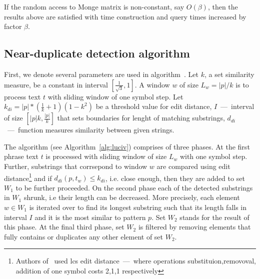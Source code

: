 If the random access to Monge matrix is non-constant, say $O(\beta)$, then the results above are satisfied with time construction and query times increased by factor $\beta$.
  

\subsection{Near-duplicate detection algorithm}
\label{sec:lucivalgo}
First, we denote several parameters are used in algorithm~\cite{luciv2019interactive}.
Let $k$, a set similarity measure, be a constant in interval $[\frac{1}{\sqrt{3}},1]$.
A window $w$ of size $L_{w} = |p|/k$ is to process text $t$ with sliding window of one symbol step.
Let $k_{di} = |p|*(\frac{1}{k}+1)(1-k^2)$ be a threshold value for edit distance,
$I$~---~interval of size $[|p|k,\frac{|p|}{k}]$ that sets boundaries for lenght of matching substrings,
$d_{di}$~---~function measures similarity between given strings.

The algorithm (see Algorithm~\ref{alg:luciv}) comprises of three phases.
At the first phrase text $t$ is processed with sliding window of size $L_{w}$ with one symbol step.
Further, substrings that corrsepond to window $w$ are compared using edit distance\footnote{
  Authors of~\cite{luciv2019interactive} used lcs edit distance~---~where  operations substituion,removoval, addition of one symbol costs 2,1,1 respectively}
and if $d_{di}(p,t_{w}) \leq k_{di}$, i.e. close enough, then they are added to set $W_{1}$ to be further proceeded. 
On the second phase each of the detected substrings in $W_{1}$ shrunk, i.e their length can be decreased.
More precisely, each element $w \in W_{1}$ is iterated over to find its longest substring such that its length falls in interval $I$ and it is the most similar to pattern $p$.
Set $W_2$ stands for the result of this phase.
At the final third phase, set $W_{2}$ is filtered by removing elements that fully contains or duplicates any other element of set $W_{2}$.

